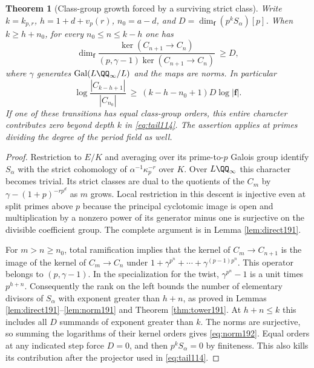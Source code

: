 \documentclass[a4paper,11pt]{article}
\newtheorem{theorem}[proposition]{Theorem}
\theoremstyle{definition}
\theoremstyle{remark}
\numberwithin{equation}{section}
\begin{document}
\begin{theorem}[Class-group growth forced by a surviving strict class]
\label{thm:norm192}
Write \(k=k_{p,r}\), \(h=1+d+v_p(r)\), \(n_0=a-d\), and
\(D=\dim_{\mathbf f}(p^kS_\alpha)[p]\). When \(k\ge h+n_0\),
for every \(n_0\le n\le k-h\) one has
\[
 \dim_{\mathbf f}
 \frac{\ker(C_{n+1}\to C_n)}
      {(p,\gamma-1)\ker(C_{n+1}\to C_n)}\ \ge D ,
\]
where \(\gamma\) generates \(\operatorname{Gal}(L\QQ_\infty/L)\)
and the maps are norms. In particular
\begin{equation}
 \log\frac{|C_{k-h+1}|}{|C_{n_0}|}
           \ \ge\ (k-h-n_0+1)D\log|\mathbf f| .
 \label{eq:norm192}
\end{equation}
If one of these transitions has equal class-group orders, this
entire character contributes zero beyond depth \(k\) in
\eqref{eq:tail114}. The assertion applies at primes dividing
the degree of the period field as well.
\end{theorem}
\begin{proof}
Restriction to \(E/K\) and averaging over its prime-to-\(p\)
Galois group identify \(S_\alpha\) with the strict cohomology
of \(\alpha^{-1}\kappa_p^{-r}\) over \(K\). Over \(L\QQ_\infty\)
this character becomes trivial. Its strict classes are dual to
the quotients of the \(C_m\) by
\(\gamma-(1+p)^{-rp^d}\) as \(m\) grows. Local restriction in
this descent is injective even at split primes above \(p\)
because the principal cyclotomic image is open and multiplication by a
nonzero power of its generator minus one is surjective on the
divisible coefficient group. The complete argument is in
Lemma \ref{lem:direct191}.

For \(m>n\ge n_0\), total ramification implies that the kernel
of \(C_m\to C_{n+1}\) is the image of the kernel of \(C_m\to C_n\)
under \(1+\gamma^{p^n}+\cdots+\gamma^{(p-1)p^n}\).
This operator belongs to \((p,\gamma-1)\). In the specialization
for the twist, \(\gamma^{p^n}-1\) is a unit times \(p^{h+n}\).
Consequently the rank on the left bounds the number of elementary
divisors of \(S_\alpha\) with exponent greater than \(h+n\), as
proved in Lemmas \ref{lem:direct191}--\ref{lem:norm191} and Theorem \ref{thm:tower191}. At \(h+n\le k\) this includes
all \(D\) summands of exponent greater than \(k\). The norms are
surjective, so summing the logarithms of their kernel orders gives
\eqref{eq:norm192}. Equal orders at any indicated step force
\(D=0\), and then \(p^k S_\alpha=0\) by finiteness.
This also kills its contribution after the projector used in
\eqref{eq:tail114}.
\end{proof}
\end{document}
